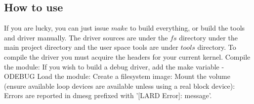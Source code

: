 \documentclass{article}
\begin{document}
\subsection{How to use}
If you are lucky, you can just issue $make$ to build everything, or build the tools and driver manually.
The driver sources are under the $fs$ directory under the main project directory and the user space tools are under $tools$ directory.
To compile the driver you must acquire the headers for your current kernel.\newline
Compile the module:
\vspace{0.15cm}
\newline
{}
\vspace{0.15cm}
\newline
If you wish to build a debug driver, add the make variable -ODEBUG
\newline
Load the module:
\vspace{0.15cm}
\newline
{}
\vspace{0.15cm}
\newline
Create a filesystem image:
\vspace{0.15cm}
\newline
{}
\vspace{0.15cm}
\newline
Mount the volume (ensure available loop devices are available unless using a real block device):
\vspace{0.15cm}
\newline
{}
\vspace{0.15cm}
\newline
Errors are reported in dmesg prefixed with '[LARD Error]: message'.
\end{document}
